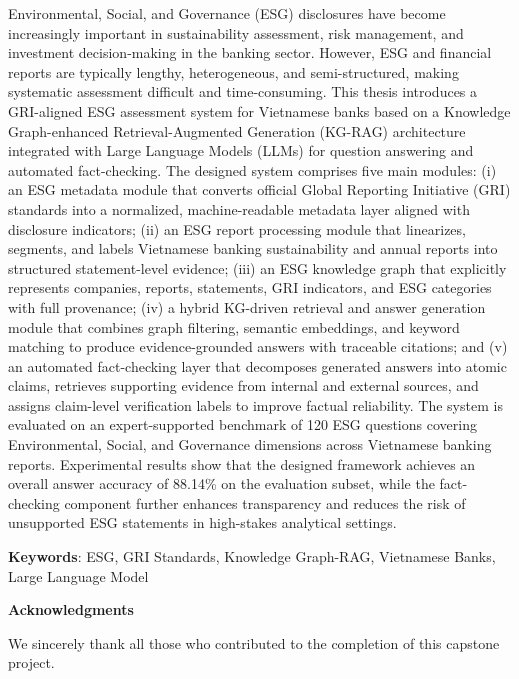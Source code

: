 \documentclass[sn-mathphys, oneside]{sn-jnl}
\begin{document}
Environmental, Social, and Governance (ESG) disclosures have become increasingly important in sustainability assessment, risk management, and investment decision-making in the banking sector. However, ESG and financial reports are typically lengthy, heterogeneous, and semi-structured, making systematic assessment difficult and time-consuming. This thesis introduces a GRI-aligned ESG assessment system for Vietnamese banks based on a Knowledge Graph-enhanced Retrieval-Augmented Generation (KG-RAG) architecture integrated with Large Language Models (LLMs) for question answering and automated fact-checking. The designed system comprises five main modules: (i) an ESG metadata module that converts official Global Reporting Initiative (GRI) standards into a normalized, machine-readable metadata layer aligned with disclosure indicators; (ii) an ESG report processing module that linearizes, segments, and labels Vietnamese banking sustainability and annual reports into structured statement-level evidence; (iii) an ESG knowledge graph that explicitly represents companies, reports, statements, GRI indicators, and ESG categories with full provenance; (iv) a hybrid KG-driven retrieval and answer generation module that combines graph filtering, semantic embeddings, and keyword matching to produce evidence-grounded answers with traceable citations; and (v) an automated fact-checking layer that decomposes generated answers into atomic claims, retrieves supporting evidence from internal and external sources, and assigns claim-level verification labels to improve factual reliability. The system is evaluated on an expert-supported benchmark of 120 ESG questions covering Environmental, Social, and Governance dimensions across Vietnamese banking reports. Experimental results show that the designed framework achieves an overall answer accuracy of 88.14\% on the evaluation subset, while the fact-checking component further enhances transparency and reduces the risk of unsupported ESG statements in high-stakes analytical settings.

\textbf{Keywords}: ESG, GRI Standards, Knowledge Graph-RAG, Vietnamese Banks, Large Language Model

\newpage
\begin{center}
    \bfseries\Large Acknowledgments
\end{center}

We sincerely thank all those who contributed to the completion of this capstone project.
\end{document}
